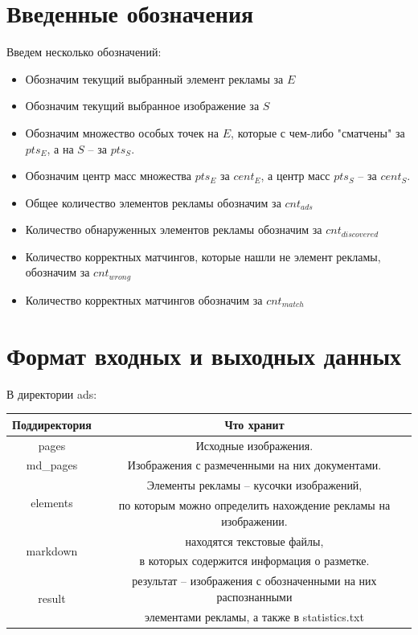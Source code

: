 \documentclass[a4paper,12pt,preview]{report} %
\begin{document}
	\section{Введенные обозначения}
	
	
	Введем несколько обозначений:
	
	\begin{itemize}
		\item Обозначим текущий выбранный элемент рекламы за $E$
		\item Обозначим текущий выбранное изображение за $S$
		\item Обозначим множество особых точек на $E$, которые с чем-либо "сматчены" за $pts_E$, а на $S$ -- за $pts_S$.
		\item Обозначим центр масс множества $pts_E$ за $cent_E$, а центр масс $pts_S$ -- за $cent_S$.
		\item Общее количество элементов рекламы обозначим за $cnt_{ads}$
		\item Количество обнаруженных элементов рекламы обозначим за $cnt_{discovered}$
		\item Количество корректных матчингов, которые нашли не элемент рекламы, обозначим за $cnt_{wrong}$
		\item Количество корректных матчингов обозначим за $cnt_{match}$
	\end{itemize}
	
	\section{Формат входных и выходных данных}
	
	В директории ads:
	
	\begin{center}
	\begin{tabular}{| c | c |}
		\hline
		Поддиректория & Что хранит\\		
		\hline
		pages & Исходные изображения.\\
		\hline
		md\_pages & Изображения с размеченными на них документами.\\
		\hline
		\multirow{2}{*}{elements} & Элементы рекламы -- кусочки изображений, \\
		\text{} &  по которым можно определить нахождение рекламы на изображении. \\
		\hline
		\multirow{2}{*}{markdown} & находятся текстовые файлы, \\
		\text{} & в которых содержится информация о разметке. \\
		\hline
		\multirow{2}{*}{result} & результат -- изображения с обозначенными на них распознанными\\
		\text{} & элементами рекламы, а также в statistics.txt \\
		\hline
	\end{tabular}
	\end{center}
	
\end{document}
